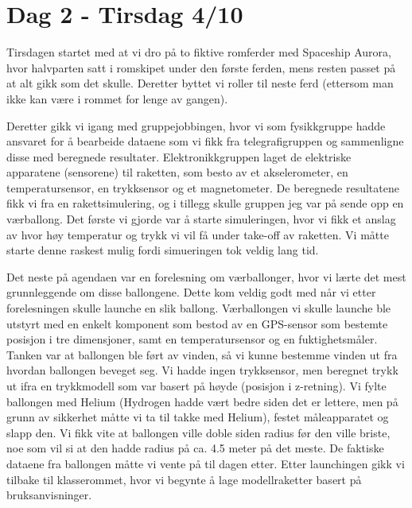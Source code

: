 \documentclass[norsk,a4paper,12pt]{article}
\begin{document}
\section*{Dag 2 - Tirsdag 4/10}
Tirsdagen startet med at vi dro p{\aa} to fiktive romferder med Spaceship Aurora, hvor halvparten satt i romskipet under den f{\o}rste ferden, mens resten passet p{\aa} at alt gikk som det skulle. Deretter byttet vi roller til neste ferd (ettersom man ikke kan v{\ae}re i rommet for lenge av gangen). \par\vspace{3mm}
Deretter gikk vi igang med gruppejobbingen, hvor vi som fysikkgruppe hadde ansvaret for {\aa} bearbeide dataene som vi fikk fra telegrafigruppen og sammenligne disse med beregnede resultater. Elektronikkgruppen laget de elektriske apparatene (sensorene) til raketten, som besto av et akselerometer, en temperatursensor, en trykksensor og et magnetometer. De beregnede resultatene fikk vi fra en rakettsimulering, og i tillegg skulle gruppen jeg var p{\aa} sende opp en v{\ae}rballong. Det f{\o}rste vi gjorde var {\aa} starte simuleringen, hvor vi fikk et anslag av hvor h{\o}y temperatur og trykk vi vil f{\aa} under take-off av raketten. Vi m{\aa}tte starte denne raskest mulig fordi simueringen tok veldig lang tid. \par\vspace{3mm}
Det neste p{\aa} agendaen var en forelesning om v{\ae}rballonger, hvor vi l{\ae}rte det mest grunnleggende om disse ballongene. Dette kom veldig godt med n{\aa}r vi etter forelesningen skulle launche en slik ballong. V{\ae}rballongen vi skulle launche ble utstyrt med en enkelt komponent som bestod av en GPS-sensor som bestemte posisjon i tre dimensjoner, samt en temperatursensor og en fuktighetsm{\aa}ler. Tanken var at ballongen ble f{\o}rt av vinden, s{\aa} vi kunne bestemme vinden ut fra hvordan ballongen beveget seg. Vi hadde ingen trykksensor, men beregnet trykk ut ifra en trykkmodell som var basert p{\aa} h{\o}yde (posisjon i z-retning). Vi fylte ballongen med Helium (Hydrogen hadde v{\ae}rt bedre siden det er lettere, men p{\aa} grunn av sikkerhet m{\aa}tte vi ta til takke med Helium), festet m{\aa}leapparatet og slapp den. Vi fikk vite at ballongen ville doble siden radius f{\o}r den ville briste, noe som vil si at den hadde radius p{\aa} ca. 4.5 meter p{\aa} det meste. De faktiske dataene fra ballongen m{\aa}tte vi vente p{\aa} til dagen etter. Etter launchingen gikk vi tilbake til klasserommet, hvor vi begynte {\aa} lage modellraketter basert p{\aa} bruksanvisninger.
\end{document}
